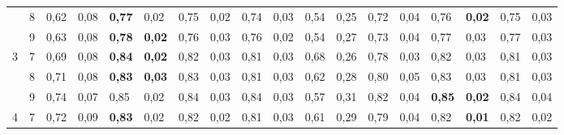 \documentclass[conference]{IEEEtran}
\begin{document}
\begin{table}[]
\begin{tabular}{|cl|ll|ll|ll|ll|ll|ll|ll|ll|}
		\multicolumn{1}{|c|}{}                    & 8 & \multicolumn{1}{l|}{0,62} & 0,08          & \multicolumn{1}{l|}{\textbf{0,77}} & 0,02          & \multicolumn{1}{l|}{0,75}          & 0,02 & \multicolumn{1}{l|}{0,74}          & 0,03 & \multicolumn{1}{l|}{0,54}                 & 0,25 & \multicolumn{1}{l|}{0,72} & 0,04 & \multicolumn{1}{l|}{0,76}          & \textbf{0,02} & \multicolumn{1}{l|}{0,75}          & 0,03          \\ \cline{2-18} 
		\multicolumn{1}{|c|}{}                    & 9 & \multicolumn{1}{l|}{0,63} & 0,08          & \multicolumn{1}{l|}{\textbf{0,78}} & \textbf{0,02} & \multicolumn{1}{l|}{0,76}          & 0,03 & \multicolumn{1}{l|}{0,76}          & 0,02 & \multicolumn{1}{l|}{0,54}                 & 0,27 & \multicolumn{1}{l|}{0,73} & 0,04 & \multicolumn{1}{l|}{0,77}          & 0,03          & \multicolumn{1}{l|}{0,77}          & 0,03          \\ \hline
		\multicolumn{1}{|c|}{\multirow{3}{*}{3}}  & 7 & \multicolumn{1}{l|}{0,69} & 0,08          & \multicolumn{1}{l|}{\textbf{0,84}} & \textbf{0,02} & \multicolumn{1}{l|}{0,82}          & 0,03 & \multicolumn{1}{l|}{0,81}          & 0,03 & \multicolumn{1}{l|}{0,68}                 & 0,26 & \multicolumn{1}{l|}{0,78} & 0,03 & \multicolumn{1}{l|}{0,82}          & 0,03          & \multicolumn{1}{l|}{0,81}          & 0,03          \\ \cline{2-18} 
		\multicolumn{1}{|c|}{}                    & 8 & \multicolumn{1}{l|}{0,71} & 0,08          & \multicolumn{1}{l|}{\textbf{0,83}} & \textbf{0,03} & \multicolumn{1}{l|}{0,83}          & 0,03 & \multicolumn{1}{l|}{0,81}          & 0,03 & \multicolumn{1}{l|}{0,62}                 & 0,28 & \multicolumn{1}{l|}{0,80} & 0,05 & \multicolumn{1}{l|}{0,83}          & 0,03          & \multicolumn{1}{l|}{0,81}          & 0,03          \\ \cline{2-18} 
		\multicolumn{1}{|c|}{}                    & 9 & \multicolumn{1}{l|}{0,74} & 0,07          & \multicolumn{1}{l|}{0,85}          & 0,02          & \multicolumn{1}{l|}{0,84}          & 0,03 & \multicolumn{1}{l|}{0,84}          & 0,03 & \multicolumn{1}{l|}{0,57}                 & 0,31 & \multicolumn{1}{l|}{0,82} & 0,04 & \multicolumn{1}{l|}{\textbf{0,85}} & \textbf{0,02} & \multicolumn{1}{l|}{0,84}          & 0,04          \\ \hline
		\multicolumn{1}{|c|}{\multirow{3}{*}{4}}  & 7 & \multicolumn{1}{l|}{0,72} & 0,09          & \multicolumn{1}{l|}{\textbf{0,83}} & 0,02          & \multicolumn{1}{l|}{0,82}          & 0,02 & \multicolumn{1}{l|}{0,81}          & 0,03 & \multicolumn{1}{l|}{0,61}                 & 0,29 & \multicolumn{1}{l|}{0,79} & 0,04 & \multicolumn{1}{l|}{0,82}          & \textbf{0,01} & \multicolumn{1}{l|}{0,82}          & 0,02          \\ \cline{2-18} 

\end{tabular}
\end{table}
\end{document}
